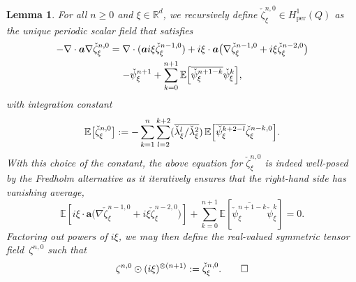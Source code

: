 \documentclass[JEP,XML,SOM,Unicode,published]{cedram}
\theoremstyle{plain}
\newtheorem{lem0}[theor0]{Lemma}
\newenvironment{lem}
{\renewcommand{\qedsymbol}{$\lozenge$}\pushQED{\qed}\begin{lem0}}
{\popQED\end{lem0}}
\theoremstyle{definition}
\numberwithin{equation}{section}
\newcommand{\R}{\mathbb R}
\newcommand{\per}{{\operatorname{per}}}
\newcommand{\Aa}{\boldsymbol a}
\newcommand{\expec}[1]{\mathbb{E}\left[ #1 \right]}
\newcommand{\Bexpec}[1]{\mathbb{E}\Bigl[ #1 \Bigr]}
\newcommand{\expecm}[1]{\mathbb{E}\bigl[ #1 \bigr]}\let\bexpec\expecm
\begin{document}
\begin{lem}\label{lem:spec-corr-zeta-1}
For all $n\ge0$ and $\xi\in \R^d$, we recursively define $\check\zeta^{n,0}_\xi\in H^1_{{\per}}(Q)$ as the unique periodic scalar field that satisfies
\begin{multline}\label{e.zeta0n}
-\nabla\cdot\Aa\nabla\check \zeta^{n,0}_\xi=\nabla\cdot(\Aa i\xi\check\zeta^{n-1,0}_\xi)
+i\xi\cdot\Aa\big(\nabla\check\zeta^{n-1,0}_\xi+i\xi\check\zeta^{n-2,0}_\xi\big)\\
-\check\psi^{n+1}_\xi+\sum_{k=0}^{n+1}\Bexpec{\overline{\check\psi^{n+1-k}_\xi}\check\psi^k_\xi},
\end{multline}
with integration constant\vspace*{-3pt}
\begin{equation}\label{eq:expec-zeta}
\expecm{\check \zeta^{n,0}_\xi}:=-\sum_{k=1}^{n}\sum_{l=2}^{k+2}(\overline{\check \lambda_\xi^l/\check \lambda_\xi^2})\,\Bexpec{\overline{\check\psi^{k+2-l}_\xi}\check\zeta^{n-k,0}_\xi}.
\end{equation}
With this choice of the constant, the above equation for $\check\zeta^{n,0}_\xi$ is indeed well-posed by the Fredholm alternative as it iteratively ensures that the right-hand side has vanishing average,\vspace*{-3pt}
\begin{equation}\label{eq:chocolate}
\expec{i\xi\cdot\Aa\big(\nabla\check\zeta^{n-1,0}_\xi+i\xi\check\zeta^{n-2,0}_\xi\big)}+\sum_{k=0}^{n+1}\expec{\overline{\check\psi^{n+1-k}_\xi}\check\psi^k_\xi}=0.
\end{equation}
{Factoring out powers of $i\xi$,} we may then define the real-valued symmetric tensor field~$\zeta^{n,0}$ such that\vspace*{-3pt}
\[\zeta^{n,0} \odot (i\xi)^{\otimes (n+1)}:= \check\zeta^{n,0}_{\xi}.\qedhere\]
\end{lem}
\end{document}
